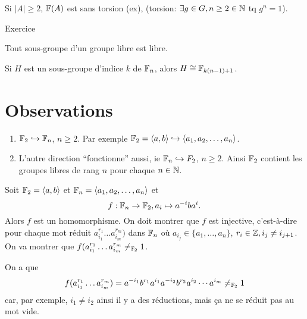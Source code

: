   \begin{prop}
    Si $|A| \geq 2$, $\mathbb{F}(A)$ est sans torsion (ex), (torsion: $\exists g \in G, n \geq 2 \in \mathbb{N}$ tq $g^n =
  1$).
  \end{prop}

  \begin{preuve}
    Exercice
  \end{preuve}

  \begin{theo}
    Tout sous-groupe d'un groupe libre est libre.
  \end{theo}

  \begin{theo}
    Si $H$ est un sous-groupe d'indice $k$ de $\mathbb{F}_n$, alors $H \cong \mathbb{F}_{k(n-1)+1}$.
  \end{theo}

  \section{Observations}
  \label{sec:prop-grp-libre-obs}
  
  \begin{enumerate}
  \item $\mathbb{F}_2 \hookrightarrow \mathbb{F}_n$, $n \geq 2$. Par exemple $\mathbb{F}_2 = \langle a, b\rangle \hookrightarrow
    \langle a_1, a_2, \ldots, a_n \rangle$.
  \item L'autre direction ``fonctionne'' aussi, ie $\mathbb{F}_n \hookrightarrow F_2$, $n \geq 2$. Ainsi $\mathbb{F}_2$
    contient les groupes libres de rang $n$ pour chaque $n \in \mathbb{N}$.
  \end{enumerate}

  \begin{ex}
    Soit $\mathbb{F}_2 = \langle a,b \rangle$ et $\mathbb{F}_n = \langle a_1, a_2, \ldots, a_n \rangle$ et 
      \[f: \mathbb{F}_n \to \mathbb{F}_2, a_i \mapsto a^{-i}ba^i.\]
    Alors $f$ est un homomorphisme. On doit montrer que $f$ est injective, c'est-à-dire pour chaque mot réduit
    $a_{i_1}^{r_1} \ldots a_{i_m}^{r_m})$ dans $\mathbb{F}_n$ où $a_{i_j} \in \{a_1, \ldots, a_n \}$, $r_i \in \mathbb{Z}, i_j
    \neq i_{j+1}$. On
    va montrer que $f(a_{i_1}^{r_1} \ldots a_{i_m}^{r_m} \neq_{\mathbb{F}_2} 1$.

    On a que
      \[f(a_{i_1}^{r_1} \ldots a_{i_m}^{r_m}) = a^{-i_1}b^{r_1}a^{i_1}a^{-i_2}b^{r_2}a^{i_2} \cdots a^{i_m}
        \neq_{\mathbb{F}_2} 1\]
    car, par exemple, $i_1 \neq i_2$ ainsi il y a des réductions, mais ça ne se réduit pas au mot vide.
  \end{ex}

